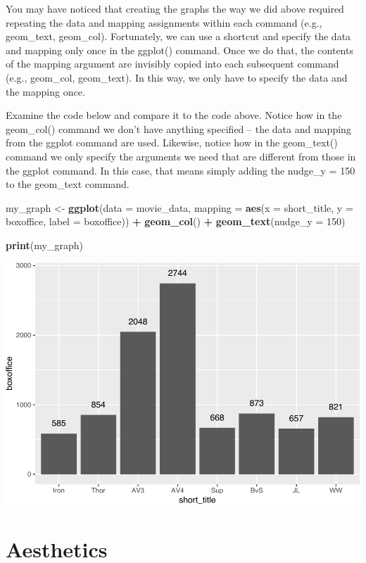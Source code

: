 \documentclass[
]{krantz}
\makeatletter
\newenvironment{Shaded}{\begin{snugshade}}{\end{snugshade}}
\newcommand{\DataTypeTok}[1]{\textcolor[rgb]{0.27,0.27,0.27}{#1}}
\newcommand{\DecValTok}[1]{\textcolor[rgb]{0.06,0.06,0.06}{#1}}
\newcommand{\KeywordTok}[1]{\textcolor[rgb]{0.27,0.27,0.27}{\textbf{#1}}}
\newcommand{\NormalTok}[1]{#1}
\newcommand{\OperatorTok}[1]{\textcolor[rgb]{0.43,0.43,0.43}{\textbf{#1}}}
\newcommand{\StringTok}[1]{\textcolor[rgb]{0.5,0.5,0.5}{#1}}
\newenvironment{kframe}{%
\medskip{}
\setlength{\fboxsep}{.8em}
 \def\at@end@of@kframe{}%
 \ifinner\ifhmode%
  \def\at@end@of@kframe{\end{minipage}}%
  \begin{minipage}{\columnwidth}%
 \fi\fi%
 \def\FrameCommand##1{\hskip\@totalleftmargin \hskip-\fboxsep
 \colorbox{shadecolor}{##1}\hskip-\fboxsep
     \hskip-\linewidth \hskip-\@totalleftmargin \hskip\columnwidth}%
 \MakeFramed {\advance\hsize-\width
   \@totalleftmargin\z@ \linewidth\hsize
   \@setminipage}}%
 {\par\unskip\endMakeFramed%
 \at@end@of@kframe}
\renewenvironment{Shaded}{\begin{kframe}}{\end{kframe}}
\makeatother
\begin{document}
You may have noticed that creating the graphs the way we did above required repeating the data and mapping assignments within each command (e.g., geom\_text, geom\_col). Fortunately, we can use a shortcut and specify the data and mapping only once in the ggplot() command. Once we do that, the contents of the mapping argument are invisibly copied into each subsequent command (e.g., geom\_col, geom\_text). In this way, we only have to specify the data and the mapping once.

Examine the code below and compare it to the code above. Notice how in the geom\_col() command we don't have anything specified -- the data and mapping from the ggplot command are used. Likewise, notice how in the geom\_text() command we only specify the arguments we need that are different from those in the ggplot command. In this case, that means simply adding the nudge\_y = 150 to the geom\_text command.

\begin{Shaded}
\begin{Highlighting}[]
\NormalTok{my_graph <-}\StringTok{ }\KeywordTok{ggplot}\NormalTok{(}\DataTypeTok{data =}\NormalTok{ movie_data,}
           \DataTypeTok{mapping =} \KeywordTok{aes}\NormalTok{(}\DataTypeTok{x =}\NormalTok{ short_title,}
                         \DataTypeTok{y =}\NormalTok{ boxoffice,}
                         \DataTypeTok{label =}\NormalTok{ boxoffice)) }\OperatorTok{+}
\StringTok{  }\KeywordTok{geom_col}\NormalTok{() }\OperatorTok{+}
\StringTok{  }\KeywordTok{geom_text}\NormalTok{(}\DataTypeTok{nudge_y =} \DecValTok{150}\NormalTok{) }

\KeywordTok{print}\NormalTok{(my_graph)}
\end{Highlighting}
\end{Shaded}

\includegraphics[width=0.65\linewidth]{bookdown_files/figure-latex/unnamed-chunk-264-1}

\hypertarget{aesthetics}{%
\section{Aesthetics}\label{aesthetics}}
\end{document}
